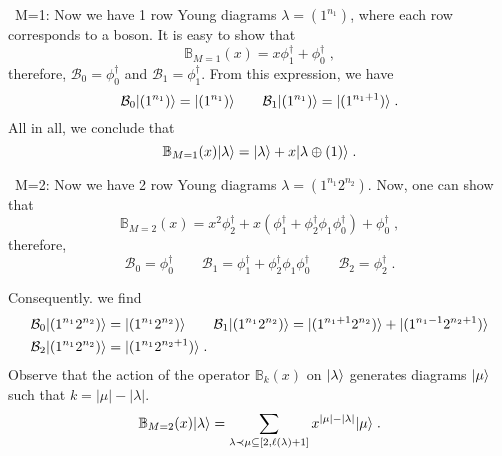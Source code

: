 \documentclass[a4paper,11pt]{amsart}
\begin{document}
\textbullet \ M=1: Now we have 1 row Young diagrams \(\lambda = (1^{n_1})\), where each row
corresponds to a boson. It is easy to show that 
\begin{equation}
 \mathbb{B}_{M=1}(x) =  x \phi_1^\dagger + \phi_0^\dagger \; ,
\end{equation}
therefore, \(\mathcal{B}_0 = \phi_0^\dagger\) and  \(\mathcal{B}_1 = \phi_1^\dagger\). 
From this expression, we have 
\begin{equation}
  \mathcal{B}_0\lvert(1^{n_1})\rangle = \lvert(1^{n_1})\rangle \qquad  
  \mathcal{B}_1\lvert(1^{n_1})\rangle = \lvert(1^{n_1+1})\rangle \; .
\end{equation}
All in all, we conclude that 
\begin{equation}
 \mathbb{B}_{M=1}(x)\lvert\lambda\rangle  =  \lvert\lambda\rangle + x\lvert\lambda \oplus (1)\rangle \;.
\end{equation}

\textbullet \ M=2: Now we have 2 row Young diagrams \(\lambda = (1^{n_1}2^{n_2})\).
Now, one can show that
\begin{equation}
  \mathbb{B}_{M=2}(x) = x^2 \phi_2^\dagger + x \left( \phi_1^\dagger
  + \phi_2^\dagger \phi_1 \phi_0^\dagger \right) + \phi_0^\dagger \; ,
\end{equation}
therefore,
\begin{equation}
\mathcal{B}_0 = \phi_0^\dagger \qquad 
\mathcal{B}_1 = \phi_1^\dagger + \phi_2^\dagger \phi_1 \phi_0^\dagger \qquad 
\mathcal{B}_2 = \phi_2^\dagger \; .
\end{equation}

Consequently. we find
\begin{subequations}
\begin{equation}
\begin{split}
  \mathcal{B}_0\lvert(1^{n_1}2^{n_2})\rangle & = \lvert(1^{n_1} 2^{n_2})\rangle \qquad  
  \mathcal{B}_1\lvert(1^{n_1}2^{n_2})\rangle = \lvert(1^{n_1+1} 2^{n_2})\rangle + \lvert(1^{n_1-1} 2^{n_2 + 1})\rangle \\
  \mathcal{B}_2\lvert(1^{n_1}2^{n_2})\rangle & = \lvert(1^{n_1}2^{n_2+1})\rangle\; .
\end{split}
\end{equation}
\end{subequations}
Observe that the action of the operator \(\mathbb{B}_k(x)\) on \(\lvert\lambda\rangle\)
generates diagrams \(\lvert\mu\rangle\) such that \(k = |\mu| - |\lambda|\). 
\begin{equation}
  \mathbb{B}_{M=2}(x) \lvert\lambda\rangle  =
  \sum_{\lambda \prec \mu \subseteq [2,\ell(\lambda) + 1]} x^{|\mu|-|\lambda|} \lvert\mu\rangle\; .
\end{equation}
\end{document}
